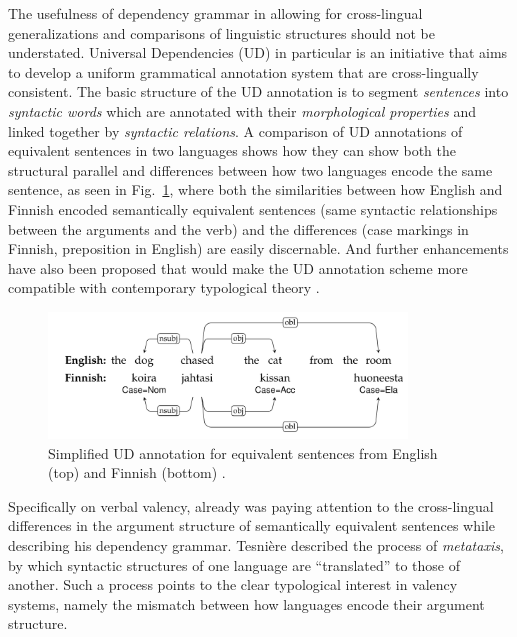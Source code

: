 The usefulness of dependency grammar in allowing for cross-lingual generalizations and comparisons of linguistic structures should not be understated. Universal Dependencies (UD) \citep{nivre2015,demarneffe2021} in particular is an initiative that aims to develop a uniform grammatical annotation system that are cross-lingually consistent. The basic structure of the UD annotation is to segment \textit{sentences} into \textit{syntactic words} which are annotated with their \textit{morphological properties} and linked together by \textit{syntactic relations}. A comparison of UD annotations of equivalent sentences in two languages shows how they can show both the structural parallel and differences between how two languages encode the same sentence, as seen in Fig.~\ref{fig:ud-example-sentence}, where both the similarities between how English and Finnish encoded semantically equivalent sentences (same syntactic relationships between the arguments and the verb) and the differences (case markings in Finnish, preposition in English) are easily discernable. And further enhancements have also been proposed that would make the UD annotation scheme more compatible with contemporary typological theory \citep{croft2017}.

\begin{figure}
    \includegraphics[width=0.85\textwidth]{figures/ud_example_sentence.png}
    \centering
    \caption{Simplified UD annotation for equivalent sentences from English (top) and Finnish (bottom) \citep{demarneffe2021}.}\label{fig:ud-example-sentence}
\end{figure}

Specifically on verbal valency, already \citet{tesniere1959} was paying attention to the cross-lingual differences in the argument structure of semantically equivalent sentences while describing his dependency grammar. Tesnière described the process of \textit{metataxis}, by which syntactic structures of one language are ``translated'' to those of another. Such a process points to the clear typological interest in valency systems, namely the mismatch between how languages encode their argument structure.

